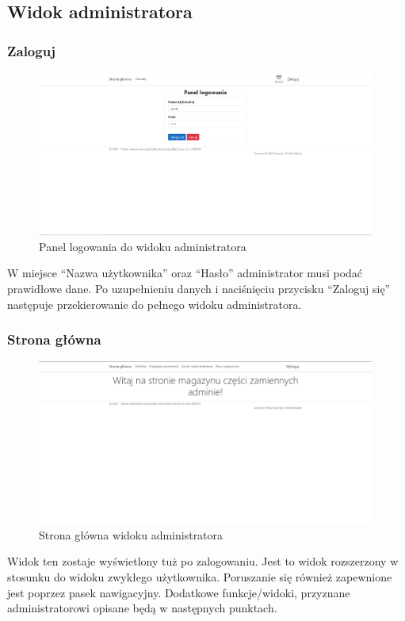 \documentclass{article}
\begin{document}
\subsection{Widok administratora}
\subsubsection{Zaloguj}
\begin{figure}[H]
   \centering
   \includegraphics[width=0.99\textwidth,frame]{Wyglad/logowanie_admin.png}
   \caption{Panel logowania do widoku administratora}
\end{figure}
W miejsce ``Nazwa użytkownika'' oraz ``Hasło'' administrator musi podać prawidłowe dane. Po uzupełnieniu
danych i naciśnięciu przycisku ``Zaloguj się'' następuje przekierowanie do pełnego widoku administratora.

\subsubsection{Strona główna}
\begin{figure}[H]
   \centering
   \includegraphics[width=0.99\textwidth,frame]{Wyglad/powitanie_admin.png}
   \caption{Strona główna widoku administratora}
\end{figure}
Widok ten zostaje wyświetlony tuż po zalogowaniu. Jest to widok rozszerzony w stosunku do widoku
zwykłego użytkownika. Poruszanie się również zapewnione jest poprzez pasek nawigacyjny. Dodatkowe
funkcje/widoki, przyznane administratorowi opisane będą w następnych punktach.
\end{document}
